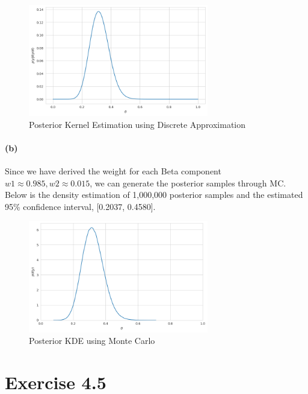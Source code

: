 \documentclass[11pt, letterpaper]{article}
\begin{document}
\begin{figure}[!h]
  \centering
  \includegraphics[width=0.7\textwidth]{4.4.a.png}
  \captionsetup{justification=centering}
  \caption{Posterior Kernel Estimation using Discrete Approximation}
\end{figure}

\paragraph{(b)}
Since we have derived the weight for each Beta component $w1\approx0.985, w2\approx0.015$, we can generate the posterior samples through MC. Below is the density estimation of 1,000,000 posterior samples and the estimated 95\% confidence interval, [0.2037, 0.4580].

\begin{figure}[!h]
  \centering
  \includegraphics[width=0.7\textwidth]{4.4.b.png}
  \captionsetup{justification=centering}
  \caption{Posterior KDE using Monte Carlo}
\end{figure}


\newpage
\section{Exercise 4.5}
\end{document}
